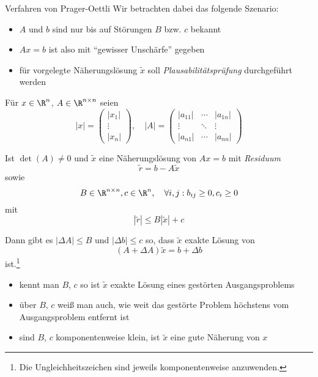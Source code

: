 \begin{defi}{Verfahren von Prager-Oettli}
    Wir betrachten dabei das folgende Szenario:
    \begin{itemize}
        \item $A$ und $b$ sind nur bis auf Störungen $B$ bzw. $c$ bekannt
        \item $Ax = b$ ist also mit \enquote{gewisser Unschärfe} gegeben
        \item für vorgelegte Näherungslösung $\tilde{x}$ soll \emph{Plausabilitätsprüfung} durchgeführt werden
    \end{itemize}
    
    Für $x \in \R^n$, $A \in \R^{n \times n}$ seien
    \[
        |x| =
        \begin{pmatrix}
            |x_1| \\ \vdots \\ |x_n|
        \end{pmatrix}, \quad
        |A| =
        \begin{pmatrix}
            |a_{11}| & \cdots & |a_{1n}| \\
            \vdots   & \ddots & \vdots   \\
            |a_{n1}| & \cdots & |a_{nn}|
        \end{pmatrix}
    \]
    
    Ist $\det(A) \neq 0$ und $\tilde{x}$ eine Näherungslösung von $Ax = b$ mit \emph{Residuum}
    \[
        \tilde{r} = b - A\tilde{x}
    \]
    sowie
    \[
        B \in \R^{n \times n}, c \in \R^n, \quad \forall i, j: b_{ij} \geq 0, c_i \geq 0
    \]
    mit
    \[
        |\tilde{r}| \leq B |\tilde{x}| + c
    \]
    
    Dann gibt es $|\Delta A| \leq B$ und $|\Delta b| \leq c$ so, dass $\tilde{x}$ exakte Lösung von
    \[
        (A + \Delta A)\tilde{x} = b + \Delta b
    \]
    ist.\footnote{Die Ungleichheitszeichen sind jeweils komponentenweise anzuwenden.}
    
    \begin{itemize}
        \item kennt man $B$, $c$ so ist $\tilde{x}$ exakte Lösung eines gestörten Ausgangsproblems
        \item über $B$, $c$ weiß man auch, wie weit das gestörte Problem höchstens vom Ausgangsproblem entfernt ist
        \item sind $B$, $c$ komponentenweise klein, ist $\tilde{x}$ eine gute Näherung von $x$
    \end{itemize}
\end{defi}

